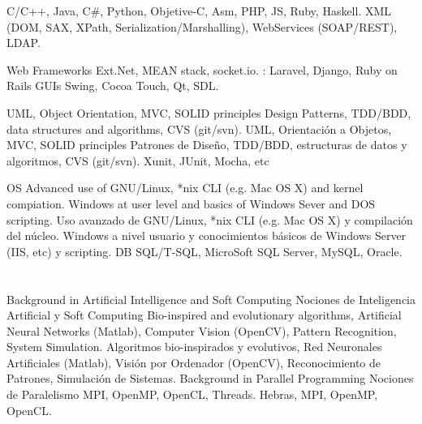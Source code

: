 \documentclass[11pt,a4paper,sans]{moderncv}
\begin{document}
\cvcomputer
    {}
        {C/C++, Java, C\#, Python, Objetive-C, Asm, PHP, JS, Ruby, Haskell.}
    {}
        {XML (DOM, SAX, XPath, Serialization/Marshalling), WebServices
        (SOAP/REST), LDAP.}

\cvcomputer
    {Web Frameworks}
        {Ext.Net, MEAN stack, socket.io. : Laravel,
        Django, Ruby on Rails}
	{GUIs}
        {Swing, Cocoa Touch, Qt, SDL.}


\cvcomputer
    {}
        {\ml
            {UML, Object Orientation, MVC, SOLID principles Design Patterns,
            TDD/BDD, data structures and algorithms, CVS (git/svn).}
            {UML, Orientación a Objetos, MVC, SOLID principles Patrones de
            Diseño, TDD/BDD, estructuras de datos y algoritmos, CVS (git/svn).}
        }
    {}
        {Xunit, JUnit, Mocha, etc}



\cvcomputer
    {OS}
        {\ml
            {Advanced use of GNU/Linux, *nix CLI (e.g. Mac OS X) and kernel
            compiation. Windows at user level and basics of Windows Sever and
            DOS scripting.}
            {Uso avanzado de GNU/Linux, *nix CLI (e.g. Mac OS X) y compilación
            del núcleo. Windows a nivel usuario y conocimientos básicos de
            Windows Server (IIS, etc) y scripting.}
        }
    {DB}
        {SQL/T-SQL, MicroSoft SQL Server, MySQL, Oracle.}


\section{}


\cvcomputer
    {\ml
    {Background in Artificial Intelligence and Soft Computing}
    {Nociones de Inteligencia Artificial y Soft Computing}}
        {\ml
        {Bio-inspired and evolutionary algorithms, Artificial Neural Networks
        (Matlab), Computer Vision (OpenCV), Pattern Recognition, System
        Simulation.}
        {Algoritmos bio-inspirados y evolutivos, Red Neuronales Artificiales
        (Matlab), Visión por Ordenador (OpenCV), Reconocimiento de Patrones,
        Simulación de Sistemas.}}
    {\ml
    {Background in Parallel Programming}
    {Nociones de Paralelismo}}
        {\ml
        {MPI, OpenMP, OpenCL, Threads.}
        {Hebras, MPI, OpenMP, OpenCL.}}
\end{document}
